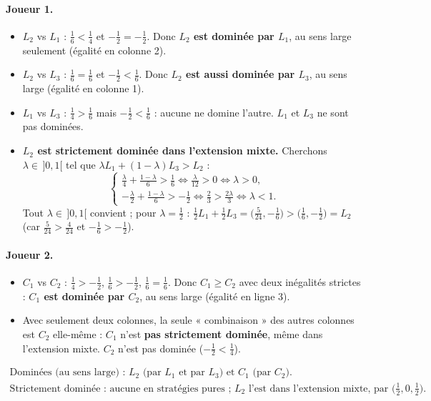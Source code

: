\documentclass[11pt,a4paper]{article}
\begin{document}
\paragraph{Joueur 1.}
\begin{itemize}
\item $L_2$ vs $L_1$ : $\frac16<\frac14$ et $-\frac12=-\frac12$. Donc \textbf{$L_2$ est dominée par $L_1$}, au sens large seulement (égalité en colonne 2).
\item $L_2$ vs $L_3$ : $\frac16=\frac16$ et $-\frac12<\frac16$. Donc \textbf{$L_2$ est aussi dominée par $L_3$}, au sens large (égalité en colonne 1).
\item $L_1$ vs $L_3$ : $\frac14>\frac16$ mais $-\frac12<\frac16$ : aucune ne domine l'autre. $L_1$ et $L_3$ ne sont pas dominées.
\item \textbf{$L_2$ est strictement dominée dans l'extension mixte.} Cherchons $\lambda\in\,]0,1[$ tel que $\lambda L_1+(1-\lambda)L_3>L_2$ :
\[
\begin{cases}
\frac{\lambda}{4}+\frac{1-\lambda}{6}>\frac16 \iff \frac{\lambda}{12}>0\iff\lambda>0,\\[1mm]
-\frac{\lambda}{2}+\frac{1-\lambda}{6}>-\frac12\iff \frac23>\frac{2\lambda}{3}\iff\lambda<1.
\end{cases}
\]
Tout $\lambda\in\,]0,1[$ convient ; pour $\lambda=\frac12$ : $\frac12L_1+\frac12L_3=\big(\frac{5}{24},-\frac16\big)>\big(\frac16,-\frac12\big)=L_2$ (car $\frac5{24}>\frac4{24}$ et $-\frac16>-\frac12$).
\end{itemize}

\paragraph{Joueur 2.}
\begin{itemize}
\item $C_1$ vs $C_2$ : $\frac14>-\frac12$, $\frac16>-\frac12$, $\frac16=\frac16$. Donc $C_1\ge C_2$ avec deux inégalités strictes : \textbf{$C_1$ est dominée par $C_2$}, au sens large (égalité en ligne 3).
\item Avec seulement deux colonnes, la seule « combinaison » des autres colonnes est $C_2$ elle-même : $C_1$ n'est \textbf{pas strictement dominée}, même dans l'extension mixte. $C_2$ n'est pas dominée ($-\frac12<\frac14$).
\end{itemize}

\[
\boxed{\begin{array}{l}
\text{Dominées (au sens large) : } L_2 \text{ (par } L_1 \text{ et par } L_3\text{) et } C_1 \text{ (par } C_2\text{).}\\
\text{Strictement dominée : aucune en stratégies pures ; } L_2 \text{ l'est dans l'extension mixte, par } \big(\tfrac12,0,\tfrac12\big).
\end{array}}
\]
\end{document}
